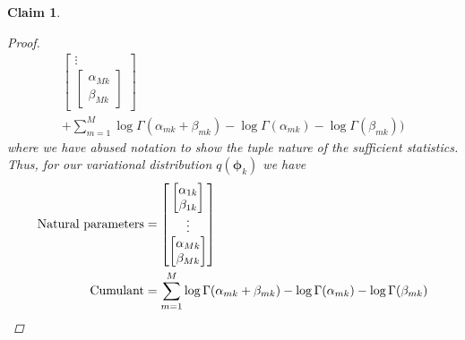 \documentclass[11pt]{article}
\newtheorem{claim}{Claim}
\begin{document}
\begin{claim}
\begin{proof}
\begin{align*}
\begin{bmatrix}
				\vdots \\
				\begin{bmatrix}
				\alpha_{Mk} \\ \beta_{Mk}
				\end{bmatrix}
			\end{bmatrix} \\
			+ \sum\limits_{m=1}^M \log \Gamma(\alpha_{mk} + \beta_{mk}) - \log \Gamma(\alpha_{mk}) - \log\Gamma(\beta_{mk}) \bigg)
\end{align*}
where we have abused notation to show the tuple nature of the sufficient statistics. Thus, for our variational distribution $q(\bm{\phi}_k)$ we have
\begin{align}
\text{Natural parameters} &=  			\begin{bmatrix}
				\begin{bmatrix}
				\alpha_{1k} \\ \beta_{1k} 
				\end{bmatrix} \\
				\vdots \\
				\begin{bmatrix}
				\alpha_{Mk} \\ \beta_{Mk}
				\end{bmatrix}
			\end{bmatrix} \\
\text{Cumulant} &= \sum\limits_{m=1}^M \log \Gamma(\alpha_{mk} + \beta_{mk}) - \log \Gamma(\alpha_{mk}) - \log\Gamma(\beta_{mk}) \qedhere
\end{align}
\end{proof}
\end{claim}
\end{document}
